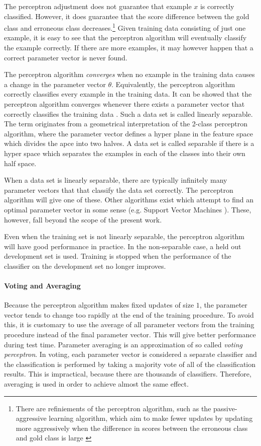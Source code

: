The perceptron adjustment does not guarantee that example $x$ is
correctly classified. However, it does guarantee that the score
difference between the gold class and erroneous class decreases.\footnote{There are refiniements of the perceptron algorithm, such as the passive-aggressive learning algorithm, which aim to make fewer updates by updating more aggressively when the difference in scores between the erroneous class and gold class is large \citep{Crammer2006}} Given
training data consisting of just one example, it is easy to see that
the perceptron algorithm will eventually classify the example
correctly. If there are more examples, it may however happen that a
correct parameter vector is never found.

The perceptron algorithm {\it converges} when no example in the
training data causes a change in the parameter vector
$\theta$. Equivalently, the perceptron algorithm correctly classifies
every example in the training data. It can be showed that the
perceptron algorithm converges whenever there exists a parameter vector
that correctly classifies the training data \citep{Freund1999}. Such a
data set is called linearly separable. The term originates from a
geometrical interpretation of the 2-class perceptron algorithm, where
the parameter vector defines a hyper plane in the feature space which
divides the apce into two halves. A data set is called separable if
there is a hyper space which separates the examples in each of the
classes into their own half space.

When a data set is linearly separable, there are typically infinitely
many parameter vectors that that classify the data set correctly. The
perceptron algorithm will give one of these. Other algorithms exist
which attempt to find an optimal parameter vector in some sense
(e.g. Support Vector Machines \citep{Cortes1995}). These, however,
fall beyond the scope of the present work.

Even when the training set is not linearly separable, the perceptron
algorithm will have good performance in practice. In the non-separable
case, a held out development set is used. Training is stopped when the
performance of the classifier on the development set no longer
improves.

\paragraph{Voting and Averaging} Because the perceptron algorithm
makes fixed updates of size $1$, the parameter vector tends to change
too rapidly at the end of the training procedure. To avoid this, it is
customary to use the average of all parameter vectors from the
training procedure instead of the final parameter vector. This will
give better performance during test time. Parameter averaging is an
approximation of so called {\it voting perceptron}. In voting, each
parameter vector is considered a separate classifier and the
classification is performed by taking a majority vote of all of the
classification results. This is impractical, because there are
thousands of classifiers. Therefore, averaging is used in order to
achieve almost the same effect.

